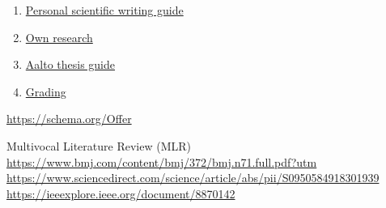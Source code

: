 \begin{enumerate}
    \item \href{https://www.overleaf.com/read/dhnssnrrxbvh#5cc69e}{Personal scientific writing guide}
    \item \href{https://survivejs.com/research/}{Own research}
    \item \href{https://www.aalto.fi/en/support-services-for-students/thesis-and-working-life-skills}{Aalto thesis guide}
    \item \href{https://mycourses.aalto.fi/mod/page/view.php?id=1074100}{Grading}
\end{enumerate}

\url{https://schema.org/Offer}

Multivocal Literature Review (MLR)
\url{https://www.bmj.com/content/bmj/372/bmj.n71.full.pdf?utm}
\url{https://www.sciencedirect.com/science/article/abs/pii/S0950584918301939}
\url{https://ieeexplore.ieee.org/document/8870142}
